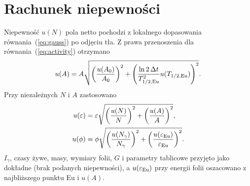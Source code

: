 \documentclass[twocolumn,a4paper,10pt]{article}
\begin{document}
\appendix
\section{Rachunek niepewności}
Niepewność $u(N)$ pola netto pochodzi z lokalnego
dopasowania równania~(\ref{eq:gauss}) po odjęciu tła.
Z prawa przenoszenia dla
równania~(\ref{eq:activity}) otrzymano
\begin{equation}
u(A)=A\sqrt{\left(\frac{u(A_0)}{A_0}\right)^2+
\left(\frac{\ln2\,\Delta t}{T_{1/2,\rm Eu}^2}
u(T_{1/2,\rm Eu})\right)^2}.
\label{eq:uactivity}
\end{equation}
Przy niezależnych $N$ i $A$ zastosowano
\begin{align}
u(\varepsilon)&=\varepsilon\sqrt{
\left(\frac{u(N)}{N}\right)^2+
\left(\frac{u(A)}{A}\right)^2},\label{eq:ueff}\\
u(\phi)&=\phi\sqrt{
\left(\frac{u(N_\gamma)}{N_\gamma}\right)^2+
\left(\frac{u(\varepsilon_{\rm Eu})}
{\varepsilon_{\rm Eu}}\right)^2}.
\label{eq:uflux}
\end{align}
$I_\gamma$, czasy żywe, masy, wymiary folii, $G$
i parametry tablicowe przyjęto jako dokładne (brak
podanych niepewności), a $u(\varepsilon_{\rm Eu})$
przy energii folii oszacowano z najbliższego punktu Eu i $u(A)$.
\end{document}
